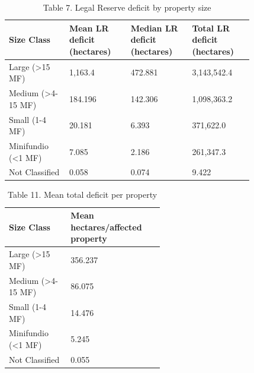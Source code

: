 \documentclass[12pt]{article}
\begin{document}
\begin{table}[H]
\centering
\caption{Table 7. Legal Reserve deficit by property size}
{\fontsize{12}{14}\selectfont
\setlength{\tabcolsep}{3pt}
\renewcommand{\arraystretch}{1.08}
\begin{tabular}{p{0.205\linewidth}p{0.205\linewidth}p{0.205\linewidth}p{0.205\linewidth}}
\toprule
Size Class & Mean LR deficit (hectares) & Median LR deficit (hectares) & Total LR deficit (hectares) \\
\midrule
Large (>15 MF) & 1,163.4 & 472.881 & 3,143,542.4 \\
Medium (>4-15 MF) & 184.196 & 142.306 & 1,098,363.2 \\
Small (1-4 MF) & 20.181 & 6.393 & 371,622.0 \\
Minifundio (<1 MF) & 7.085 & 2.186 & 261,347.3 \\
Not Classified & 0.058 & 0.074 & 9.422 \\
\bottomrule
\end{tabular}
}
\end{table}

\begin{table}[H]
\centering
\caption{Table 11. Mean total deficit per property}
{\fontsize{12}{14}\selectfont
\setlength{\tabcolsep}{3pt}
\renewcommand{\arraystretch}{1.08}
\begin{tabular}{p{0.260\linewidth}p{0.260\linewidth}}
\toprule
Size Class & Mean hectares/affected property \\
\midrule
Large (>15 MF) & 356.237 \\
Medium (>4-15 MF) & 86.075 \\
Small (1-4 MF) & 14.476 \\
Minifundio (<1 MF) & 5.245 \\
Not Classified & 0.055 \\
\bottomrule
\end{tabular}
}
\end{table}
\end{document}
